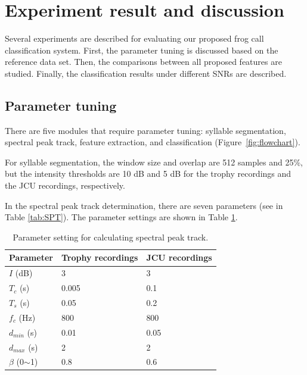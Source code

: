 %


\section{Experiment result and discussion}
Several experiments are described for evaluating our proposed frog call classification system. First, the parameter tuning is discussed based on the reference data set. Then, the comparisons between all proposed features are studied. Finally, the classification results under different SNRs are described.

\subsection{Parameter tuning}
There are five modules that require parameter tuning: syllable segmentation, spectral peak track, feature extraction, and classification (Figure~\ref{fig:flowchart}). 

For syllable segmentation, the window size and overlap are 512 samples and 25\%, but the intensity thresholds are 10 dB and 5 dB for the trophy recordings and the JCU recordings, respectively.


In the spectral peak track determination, there are seven parameters (see in Table \ref{tab:SPT}). The parameter settings are shown in Table \ref{tab:value}.
\begin{table}[htb!]
\centering
\caption{Parameter setting for calculating spectral peak track.}
\label{tab:value}
\begin{tabular}{lll}
\hline
\textbf{Parameter} & \textbf{Trophy recordings} & \textbf{JCU recordings} \\ \hline\hline
   $I$ (dB)        & 3             & 3             \\ 
    $T_{c}$ (s)        & 0.005         & 0.1           \\ 
  $T_{s}$ (s)        & 0.05          & 0.2           \\ 
      $f_{c}$ (Hz)        & 800           & 800           \\ 
   $d_{min}$ (s)         & 0.01          & 0.05          \\ 
     $d_{max}$ (s)        & 2             & 2             \\ 
     $\beta$ (0$\sim$1)          & 0.8           & 0.6           \\ \hline\hline
\end{tabular}
\end{table}
                              

